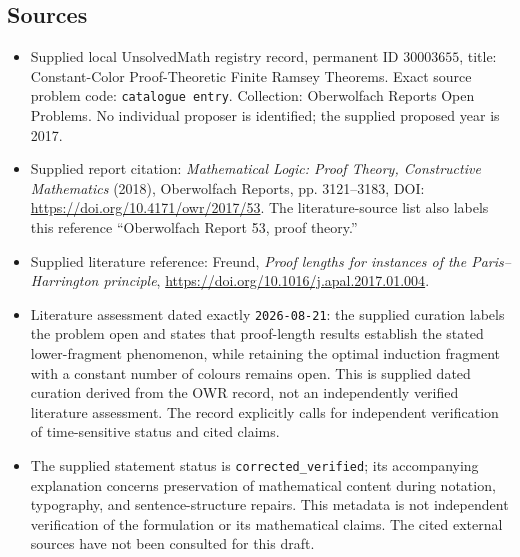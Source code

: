 \documentclass[11pt]{article}
\begin{document}
\subsection{Sources}
\begin{itemize}
\item Supplied local UnsolvedMath registry record, permanent ID \(30003655\), title: Constant-Color Proof-Theoretic Finite Ramsey Theorems. Exact source problem code: \texttt{catalogue entry}. Collection: Oberwolfach Reports Open Problems. No individual proposer is identified; the supplied proposed year is 2017.
\item Supplied report citation: \emph{Mathematical Logic: Proof Theory, Constructive Mathematics} (2018), Oberwolfach Reports, pp. 3121--3183, DOI: \url{https://doi.org/10.4171/owr/2017/53}. The literature-source list also labels this reference ``Oberwolfach Report 53, proof theory.''
\item Supplied literature reference: Freund, \emph{Proof lengths for instances of the Paris--Harrington principle}, \url{https://doi.org/10.1016/j.apal.2017.01.004}.
\item Literature assessment dated exactly \texttt{2026-08-21}: the supplied curation labels the problem open and states that proof-length results establish the stated lower-fragment phenomenon, while retaining the optimal induction fragment with a constant number of colours remains open. This is supplied dated curation derived from the OWR record, not an independently verified literature assessment. The record explicitly calls for independent verification of time-sensitive status and cited claims.
\item The supplied statement status is \texttt{corrected\_verified}; its accompanying explanation concerns preservation of mathematical content during notation, typography, and sentence-structure repairs. This metadata is not independent verification of the formulation or its mathematical claims. The cited external sources have not been consulted for this draft.
\end{itemize}
\end{document}
